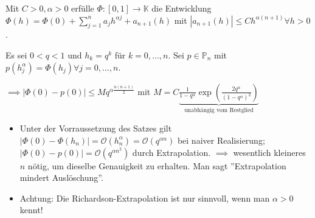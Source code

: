 \begin{theorem}
	Mit $C > 0, \alpha > 0$ erfülle $\Phi: [0, 1] \rightarrow \mathbb{K}$ die Entwicklung $\Phi(h) = \Phi(0) + \sum_{j=1}^{n} a_j h^{\alpha j} + a_{n+1}(h)$ mit $|a_{n+1}(h)| \leq C h^{\alpha (n+1)} \forall h > 0$.
	
	Es sei $0 < q < 1$ und $h_k = q^k$ für $k=0, ..., n$. Sei $p \in \mathbb{P}_n$ mit $p(h_j^\alpha) = \Phi(h_j) \forall j=0, ..., n$.
	
	$\implies |\Phi(0) - p(0)| \leq M q^{\alpha \frac{n(n+1)}{2}}$ mit $M = C \underbrace{\frac{1}{1-q^\alpha} \exp\left(\frac{2q^\alpha}{(1-q^\alpha)^2}\right)}_{\text{unabhängig vom Restglied}}$
\end{theorem}

\begin{remark}
	\begin{itemize}
		\item Unter der Vorraussetzung des Satzes gilt $|\Phi(0) - \Phi(h_n)| = \mathcal{O}(h_n^\alpha) = \mathcal{O}(q^{\alpha n})$ bei naiver Realisierung; $|\Phi(0) - p(0)| = \mathcal{O}(q^{\alpha n^2})$ durch Extrapolation. $\implies$ wesentlich kleineres $n$ nötig, um dieselbe Genauigkeit zu erhalten. Man sagt ''Extrapolation mindert Auslöschung''.
		
		\item Achtung: Die Richardson-Extrapolation ist nur sinnvoll, wenn man $\alpha > 0$ kennt!
	\end{itemize}
\end{remark}

